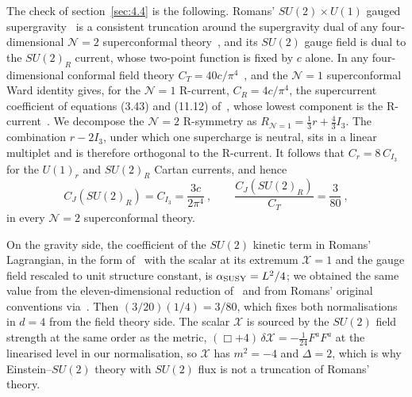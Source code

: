The check of section~\ref{sec:4.4} is the following. Romans' $SU(2)\times U(1)$
gauged supergravity~\cite{Romans:1985ps} is a consistent truncation around
the supergravity dual of any four-dimensional $\mathcal{N} = 2$
superconformal theory~\cite{Gauntlett:2007sm,Malek:2017njj}, and its $SU(2)$ gauge field
is dual to the $SU(2)_R$ current, whose two-point function is fixed by $c$
alone. In any four-dimensional conformal field theory
$C_T = 40c/\pi^4$~\cite{Osborn:1993cr},
and the $\mathcal{N} = 1$ superconformal Ward identity gives, for the
$\mathcal{N} = 1$ R-current, $C_R = 4c/\pi^4$, the supercurrent coefficient of
equations (3.43) and (11.12) of~\cite{Osborn:1998qu}, whose lowest component is the
R-current~\cite{Anselmi:1997am}. We decompose the $\mathcal{N} = 2$
R-symmetry as $R_{\mathcal{N}=1} = \tfrac13 r + \tfrac43 I_3$. The
combination $r - 2I_3$, under which one supercharge is neutral, sits in a
linear multiplet and is therefore orthogonal to the R-current. It follows
that $C_r = 8\,C_{I_3}$ for the $U(1)_r$ and $SU(2)_R$
Cartan currents, and hence
\begin{equation}
C_J(SU(2)_R) = C_{I_3} = \frac{3c}{2\pi^4}~, \qquad \frac{C_J(SU(2)_R)}{C_T} = \frac{3}{80}~,
\end{equation}
in every $\mathcal{N} = 2$ superconformal theory.

On the gravity side, the coefficient of the $SU(2)$ kinetic term in Romans'
Lagrangian, in the form of~\cite{Lu:1999bw} with the scalar at its
extremum $\mathcal{X} = 1$ and the gauge field rescaled to unit structure constant, is
$\alpha_{\rm SUSY} = L^2/4$; we obtained the same value from the
eleven-dimensional reduction of~\cite{Gauntlett:2007sm} and from Romans'
original conventions via~\cite{Ohl:2010au}. Then
$(3/20)(1/4) = 3/80$, which fixes both normalisations in $d = 4$ from the
field theory side. The scalar $\mathcal{X}$ is sourced by the $SU(2)$ field strength
at the same order as the metric, $(\Box + 4)\,\delta\mathcal{X} = -\tfrac1{24}F^aF^a$
at the linearised level in our normalisation, so $\mathcal{X}$ has
$m^2 = -4$ and $\Delta = 2$, which is why Einstein--$SU(2)$ theory with $SU(2)$
flux is not a truncation of Romans' theory.

